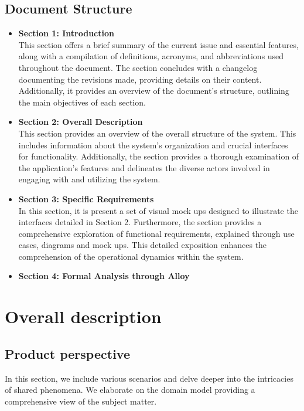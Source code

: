 \documentclass[12pt,oneside,a4paper]{article}
\begin{document}
\subsection{Document Structure}
\begin{itemize}
    \item \textbf{Section 1: Introduction}\\ This section offers a brief summary of the current issue and essential features, along with a compilation of definitions, acronyms, and abbreviations used throughout the document. The section concludes with a changelog documenting the revisions made, providing details on their content. Additionally, it provides an overview of the document's structure, outlining the main objectives of each section.
    \item \textbf{Section 2: Overall Description}\\ This section provides an overview of the overall structure of the system. This includes information about the system's organization and crucial interfaces for functionality. Additionally, the section provides a thorough examination of the application's features and delineates the diverse actors involved in engaging with and utilizing the system.
    \item \textbf{Section 3: Specific Requirements}\\ In this section, it is present a set of visual mock ups designed to illustrate the interfaces detailed in Section 2. Furthermore, the section provides a comprehensive exploration of functional requirements, explained through use cases, diagrams and mock ups. This detailed exposition enhances the comprehension of the operational dynamics within the system.
    \item \textbf{Section 4: Formal Analysis through Alloy}

\end{itemize}

\clearpage

\section{Overall description}
\subsection{Product perspective}
In this section, we include various scenarios and delve deeper into the intricacies of shared phenomena. We elaborate on the domain model providing a comprehensive view of the subject matter.
\end{document}
